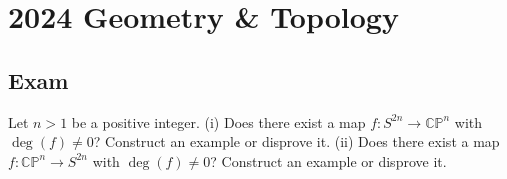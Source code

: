 \section{2024 Geometry \& Topology}

\subsection{Exam}

\begin{exercise}
\label{geometry:2024:1}
Let $n > 1$ be a positive integer.
(i) Does there exist a map $f : S^{2n} \to \mathbb{CP}^{n}$ with $\deg(f) \neq 0$? Construct an example or disprove it.
(ii) Does there exist a map $f : \mathbb{CP}^{n} \to S^{2n}$ with $\deg(f) \neq 0$? Construct an example or disprove it.
\end{exercise}

